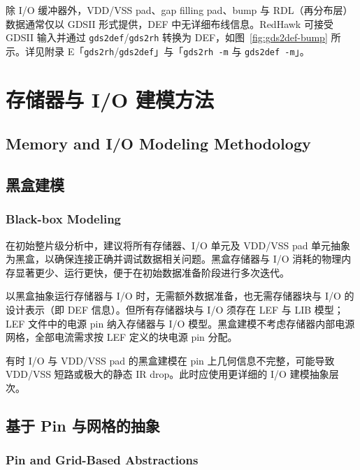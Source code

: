 
除 I/O 缓冲器外，VDD/VSS pad、gap filling pad、bump 与 RDL（再分布层）数据通常仅以 GDSII 形式提供，DEF 中无详细布线信息。RedHawk 可接受 GDSII 输入并通过 \texttt{gds2def}/\texttt{gds2rh} 转换为 DEF，如图~\ref{fig:gds2def-bump} 所示。详见附录 E「\texttt{gds2rh}/\texttt{gds2def}」与「\texttt{gds2rh -m} 与 \texttt{gds2def -m}」。


\section{存储器与 I/O 建模方法}
\subsection*{Memory and I/O Modeling Methodology}

\subsection{黑盒建模}
\subsubsection*{Black-box Modeling}

在初始整片级分析中，建议将所有存储器、I/O 单元及 VDD/VSS pad 单元抽象为黑盒，以确保连接正确并调试数据相关问题。黑盒存储器与 I/O 消耗的物理内存显著更少、运行更快，便于在初始数据准备阶段进行多次迭代。

以黑盒抽象运行存储器与 I/O 时，无需额外数据准备，也无需存储器块与 I/O 的设计表示（即 DEF 信息）。但所有存储器块与 I/O 须存在 LEF 与 LIB 模型；LEF 文件中的电源 pin 纳入存储器与 I/O 模型。黑盒建模不考虑存储器内部电源网格，全部电流需求按 LEF 定义的块电源 pin 分配。

有时 I/O 与 VDD/VSS pad 的黑盒建模在 pin 上几何信息不完整，可能导致 VDD/VSS 短路或极大的静态 IR drop。此时应使用更详细的 I/O 建模抽象层次。

\subsection{基于 Pin 与网格的抽象}
\subsubsection*{Pin and Grid-Based Abstractions}

